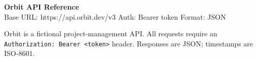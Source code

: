 \documentclass[11pt]{article}
\begin{document}
\begin{tcolorbox}[colback=ink,colframe=ink,arc=4pt,left=14pt,top=10pt,bottom=10pt]
{\color{white}\fontsize{20}{22}\selectfont\bfseries Orbit API Reference}\\[3pt]
{\color{accent!60}\small Base URL: \ttfamily https://api.orbit.dev/v3 \quad\textbullet\quad
 Auth: Bearer token \quad\textbullet\quad Format: JSON}
\end{tcolorbox}

\vspace{4pt}
Orbit is a fictional project-management API. All requests require an
\texttt{Authorization: Bearer <token>} header. Responses are JSON; timestamps are ISO-8601.





\end{document}
